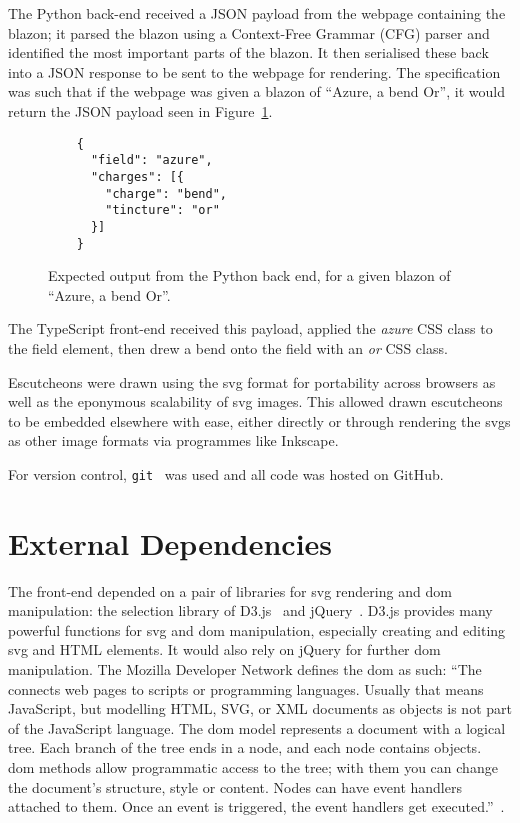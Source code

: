 \documentclass[nobib, a4paper, twoside, justified]{tufte-book}
\makeatletter
\newcommand{\svg}{\gls{svg}\@\xspace}
\newcommand{\svgs}{\glspl{svg}\@\xspace}
\newcommand{\dom}{\gls{dom}\@\xspace}
\newcommand{\blazon}{\gls{blazon}\@\xspace}
\newcommand{\payload}{\gls{payload}\@\xspace}
\makeatother
\begin{document}
The Python back-end received a JSON \payload from the webpage containing the \blazon; it parsed the
\blazon using a Context-Free Grammar (CFG) parser and identified the most important parts of the
\blazon. It then serialised these back into a JSON response to be sent to the webpage for rendering.
The specification was such that if the webpage was given a \blazon of ``Azure, a bend Or'', it would
return the JSON \payload seen in Figure~\ref{fig:expected_output}.

\begin{figure}[h]
  \begin{verbatim}
    {
      "field": "azure",
      "charges": [{
        "charge": "bend",
        "tincture": "or"
      }]
    }
  \end{verbatim}
  \caption{Expected output from the Python back end, for a given \blazon of ``Azure, a bend Or''.}%
  \label{fig:expected_output}
\end{figure}

The TypeScript front-end received this \payload, applied the \textit{azure} CSS class to the field
element, then drew a bend onto the field with an \textit{or} CSS class.

Escutcheons were drawn using the \svg{} format for portability across browsers as well as the
eponymous scalability of \svg{} images. This allowed drawn escutcheons to be embedded elsewhere
with ease, either directly or through rendering the \svgs{} as other image formats via programmes
like Inkscape.

For version control, \texttt{git}~\autocite{git} was used and all code was hosted on GitHub.

\section{External Dependencies}%
\label{sec:external_dependencies}

The front-end depended on a pair of libraries for \svg{} rendering and \dom{} manipulation: the
selection library of D3.js~\autocite{d3js} and jQuery~\autocite{jquery}. D3.js provides many
powerful functions for \svg{} and \dom{} manipulation, especially creating and editing \svg{} and
HTML elements. It would also rely on jQuery for further \dom{} manipulation. The Mozilla Developer
Network defines the \dom{} as such: ``The  connects web pages to scripts or
programming languages. Usually that means JavaScript, but modelling HTML, SVG, or XML documents as
objects is not part of the JavaScript language. The \dom{} model represents a document with a
logical tree. Each branch of the tree ends in a node, and each node contains objects.  \dom{}
methods allow programmatic access to the tree; with them you can change the document's structure,
style or content. Nodes can have event handlers attached to them. Once an event is triggered, the
event handlers get executed.''~\autocite{mdn_dom}.
\end{document}
